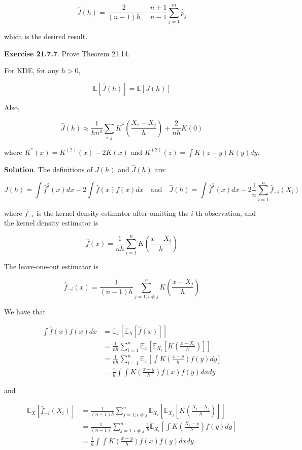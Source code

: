 \[ \hat{J}(h) = \frac{2}{(n - 1)h} - \frac{n + 1}{n - 1} \sum_{j=1}^m \hat{p}_j\]

which is the desired result.

\textbf{Exercise 21.7.7}. Prove Theorem 21.14.

For KDE, for any \(h > 0\),

\[ \mathbb{E} \left[ \hat{J}(h) \right] = \mathbb{E} \left[ J(h) \right] \]

Also,

\[ \hat{J}(h) \approx \frac{1}{hn^2}\sum_{i, j} K^* \left( \frac{X_i - X_j}{h} \right) + \frac{2}{nh} K(0) \]

where \(K^*(x) = K^{(2)}(x) - 2 K(x)\) and
\(K^{(2)}(z) = \int K(z - y) K(y) dy\).

\textbf{Solution}. The definitions of \(J(h)\) and \(\hat{J}(h)\) are:

\[ J(h) = \int \hat{f}^2(x) dx - 2 \int \hat{f}(x) f(x) dx 
\quad \text{and} \quad
\hat{J}(h) = \int \hat{f}^2(x) dx - 2 \frac{1}{n} \sum_{i=1}^n \hat{f}_{-i}(X_i) \]

where \(\hat{f}_{-i}\) is the kernel density estimator after omitting
the \(i\)-th observation, and the kernel density estimator is

\[ \hat{f}(x) = \frac{1}{nh} \sum_{i=1}^n K\left( \frac{x - X_i}{h} \right) \]

The leave-one-out estimator is

\[ \hat{f}_{-i}(x) = \frac{1}{(n - 1) h} \sum_{j=1; i \neq j}^n K \left( \frac{x - X_j}{h} \right) \]

We have that

\[ 
\begin{align}
\int \hat{f}(x) f(x) dx &=  \mathbb{E}_x \left[ \mathbb{E}_{X}\left[\hat{f}(x)\right] \right] \\
&= \frac{1}{nh} \sum_{i=1}^n \mathbb{E}_x\left[\mathbb{E}_{X_i}\left[K \left( \frac{x - X_i}{h} \right) \right] \right]  \\
&= \frac{1}{nh} \sum_{i=1}^n \mathbb{E}_x\left[ \int K \left( \frac{x - y}{h} \right) f(y) dy \right] \\
&= \frac{1}{h} \int \int K \left( \frac{x - y}{h} \right) f(x) f(y) dx  dy
\end{align}
\]

and

\[
\begin{align}
\mathbb{E}_X\left[ \hat{f}_{-i}(X_i) \right] &=
\frac{1}{(n - 1) h} \sum_{j=1; i \neq j}^n \mathbb{E}_{X_i}\left[ \mathbb{E}_{X_j}\left[ K \left( \frac{X_i - X_j}{h} \right) \right] \right] \\
&= \frac{1}{(n - 1)} \sum_{j=1; i \neq j}^n \frac{1}{h} \mathbb{E}_{X_i}\left[ \int K \left( \frac{X_i - y}{h} \right) f(y) dy \right] \\
& = \frac{1}{h} \int \int K \left( \frac{x - y}{h} \right) f(x) f(y) dx  dy
\end{align}
\]

